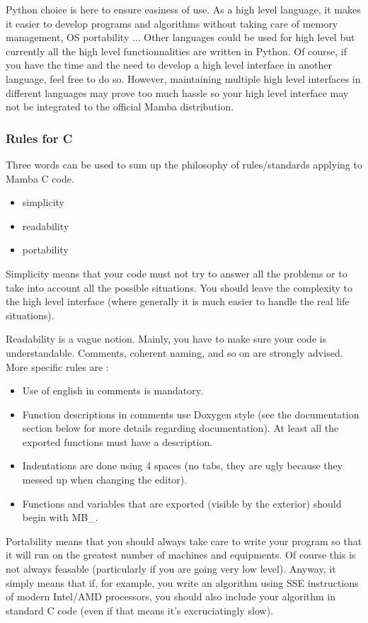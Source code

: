 \documentclass[a4paper,10pt,oneside]{article}
\begin{document}
Python choice is here to ensure easiness of use. As a high level language,
it makes it easier to develop programs and algorithms without taking
care of memory management, OS portability ... Other languages could
be used for high level but currently all the high level functionnalities
are written in Python. Of course, if you have the time and the need
to develop a high level interface in another language, feel free to
do so. However, maintaining multiple high level interfaces in different
languages may prove too much hassle so your high level interface may
not be integrated to the official Mamba distribution.

\subsubsection{Rules for C}

Three words can be used to sum up the philosophy of rules/standards
applying to Mamba C code.
\begin{itemize}
\item simplicity 
\item readability 
\item portability 
\end{itemize}
Simplicity means that your code must not try to answer all the problems
or to take into account all the possible situations. You should leave
the complexity to the high level interface (where generally it is
much easier to handle the real life situations).

Readability is a vague notion. Mainly, you have to make sure your
code is understandable. Comments, coherent naming, and so on are strongly
advised. More specific rules are :
\begin{itemize}
\item Use of english in comments is mandatory.
\item Function descriptions in comments use Doxygen style (see the documentation
section below for more details regarding documentation). At least all the 
exported functions must have a description.
\item Indentations are done using 4 spaces (no tabs, they are ugly because
they messed up when changing the editor). 
\item Functions and variables that are exported (visible by the exterior)
should begin with \textquotedbl{}MB\_\textquotedbl{}. 
\end{itemize}
Portability means that you should always take care to write your program
so that it will run on the greatest number of machines and equipments.
Of course this is not always feasable (particularly if you are going
very low level). Anyway, it simply means that if, for example, you
write an algorithm using SSE instructions of modern Intel/AMD processors,
you should also include your algorithm in standard C code (even if
that means it's excruciatingly slow).
\end{document}
